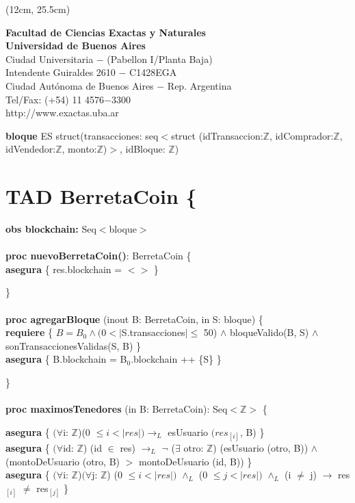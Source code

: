\documentclass{article}
\newcommand{\Entero}{$\mathds{Z}$}
\begin{document}
\begin{textblock*}{20cm} (12cm, 25.5cm)
    {\raggedright\textbf{Facultad de Ciencias Exactas y Naturales}\\
    \textbf{Universidad de Buenos Aires}\\
    Ciudad Universitaria $-$ (Pabellon I/Planta Baja)\\
    Intendente Guiraldes 2610 $-$ C1428EGA\\
    Ciudad Autónoma de Buenos Aires $-$ Rep. Argentina\\
    Tel/Fax: (+54) 11 4576$-$3300\\
    http://www.exactas.uba.ar
    }
\end{textblock*}



\newpage
\setcounter{page}{1}
\textbf{bloque} ES struct(transacciones: seq$<$struct (idTransaccion:\Entero, idComprador:\Entero, idVendedor:\Entero, monto:\Entero)$>$, idBloque: \Entero)\\
\section*{TAD \textdollar BerretaCoin \{}
    \textbf{obs blockchain:} Seq$<$bloque$>$\\\\

    \textbf{proc nuevoBerretaCoin()}: BerretaCoin \{\\
        \indent\indent \textbf{asegura} \{ res.blockchain = $<>$ \}

    \}\\\\

    \textbf{proc agregarBloque} (inout B: BerretaCoin, in S: bloque) \{\\
        \indent\indent\textbf{requiere} \{ $B = B_0 \land (0 < |$S.transacciones$| \leq$ 50) $\land$ bloqueValido(B, S) $\land$ sonTransaccionesValidas(S, B) \}\\
        \indent\indent\textbf{asegura} \{ B.blockchain = B${_0}$.blockchain ++ \{S\} \}

    \}\\\\

    \textbf{proc maximosTenedores} (in B: BerretaCoin): Seq$<$\Entero$>$ \{

        \indent\indent\textbf{asegura} \{ $(\forall$i: \Entero)(0 $\le i < |res|) \rightarrow_{L}$
                                            esUsuario $(res_{[i]}$, B) \}\\
        \indent\indent\textbf{asegura} \{ $(\forall$id: \Entero) (id $\in$ res) $\rightarrow_{L}$
                                         $\neg$ ($\exists$ otro: \Entero) (esUsuario (otro, B)) $\land$\\
        \indent\indent\indent\indent\indent (montoDeUsuario (otro, B) $>$ montoDeUsuario (id, B)) \}\\
        \indent\indent\textbf{asegura} \{ $(\forall$i: \Entero)$(\forall$j: \Entero) (0 $\le i < |res|)$ $\land_{L}$ (0 $\le j < |res|)$ $\land_{L}$ (i $\ne$ j) $\rightarrow$ res$_{[i]}$ $\ne$ res$_{[j]}$ \}
\end{document}
